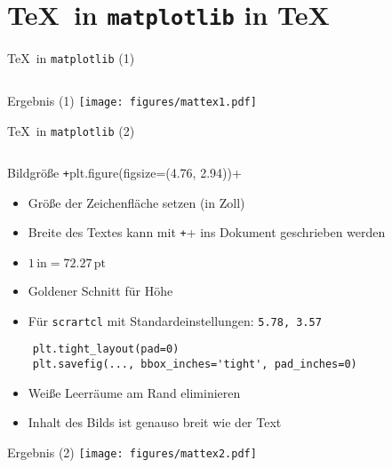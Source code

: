 \section{\TeX\ in \texttt{matplotlib} in \TeX}

\begin{frame}[fragile]{\TeX\ in \texttt{matplotlib} (1)}
  \inputminted{python}{script/mattex1.py}
\end{frame}

\AddToShipoutPictureFG*{\ShowFramePicture}
\begin{frame}{Ergebnis (1)}%
  \centering%
  \texttt{[image: figures/mattex1.pdf]}%
\end{frame}

\begin{frame}[fragile]{\TeX\ in \texttt{matplotlib} (2)}
  \inputminted{python}{script/mattex2.py}
\end{frame}

\begin{frame}[fragile]{Bildgröße}
  \texttt+plt.figure(figsize=(4.76, 2.94))+
  \begin{itemize}
    \item Größe der Zeichenfläche setzen (in Zoll)
    \item Breite des Textes kann mit \texttt+\the\textwidth+ ins Dokument geschrieben werden
    \item $1\,\mathrm{in} = \num{72.27}\,\mathrm{pt}$
    \item Goldener Schnitt für Höhe
    \item Für \texttt{scrartcl} mit Standardeinstellungen: \texttt{5.78, 3.57}
  \end{itemize}

  \begin{verbatim}
    plt.tight_layout(pad=0)
    plt.savefig(..., bbox_inches='tight', pad_inches=0)
  \end{verbatim}
  \begin{itemize}
    \item Weiße Leerräume am Rand eliminieren
    \item Inhalt des Bilds ist genauso breit wie der Text
  \end{itemize}
\end{frame}

\AddToShipoutPictureFG*{\ShowFramePicture}
\begin{frame}{Ergebnis (2)}%
  \centering%
  \texttt{[image: figures/mattex2.pdf]}%
\end{frame}

